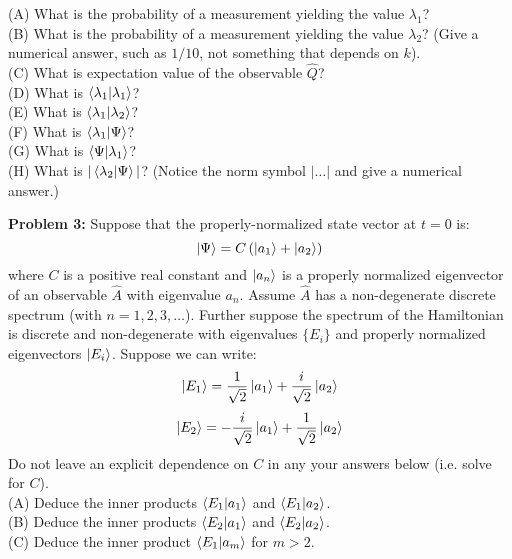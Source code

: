 \documentclass[12pt]{article}
\begin{document}
\noindent
(A) What is the probability of a measurement yielding the value $\lambda_1$?\\[5pt]

\noindent
(B) What is the probability of a measurement yielding the value $\lambda_2$?  (Give a numerical answer, such as $1/10$, not something that depends on $k$).\\[5pt]

\noindent
(C) What is expectation value of the observable $\hat{Q}$?\\[5pt]

\noindent
(D) What is $\braket{\lambda_1 | \lambda_1}$?\\[5pt]

\noindent
(E) What is $\braket{\lambda_1 | \lambda_2}$?\\[5pt]

\noindent
(F) What is $\braket{\lambda_1 | \Psi}$?\\[5pt]

\noindent
(G) What is $\braket{\Psi | \lambda_1}$?\\[5pt]

\noindent
(H) What is $|\braket{\lambda_2 | \Psi}|$?  (Notice the norm symbol $|\ldots|$ and give a numerical answer.)\\[5pt]
\newpage

\noindent
{\bf Problem 3:} Suppose that the properly-normalized state vector at $t=0$ is:
$$\ket{\Psi} = C \left( \ket{a_1} + \ket{a_2} \right)$$
where $C$ is a positive real constant and $\ket{a_n}$ is a properly normalized eigenvector of an observable $\hat{A}$ with eigenvalue $a_n$.  Assume $\hat{A}$ has a non-degenerate discrete spectrum (with $n=1,2,3,\ldots$). Further suppose the spectrum of the Hamiltonian is discrete and non-degenerate with eigenvalues $\{E_i\}$ and properly normalized eigenvectors $\ket{E_i}$.  Suppose we can write:
$$\ket{E_1} = \frac{1}{\sqrt{2}} \ket{a_1} + \frac{i}{\sqrt{2}} \ket{a_2}$$
$$\ket{E_2} = -\frac{i}{\sqrt{2}} \ket{a_1} + \frac{1}{\sqrt{2}} \ket{a_2}$$
Do not leave an explicit dependence on $C$ in any your answers below (i.e. solve for $C$).\\[5pt]

\noindent
(A) Deduce the inner products $\braket{E_1|a_1}$ and $\braket{E_1|a_2}$.\\[5pt]

\noindent
(B) Deduce the inner products $\braket{E_2|a_1}$ and $\braket{E_2|a_2}$.\\[5pt]

\noindent
(C) Deduce the inner product $\braket{E_1|a_m}$ for $m>2$.\\[5pt]
\end{document}
